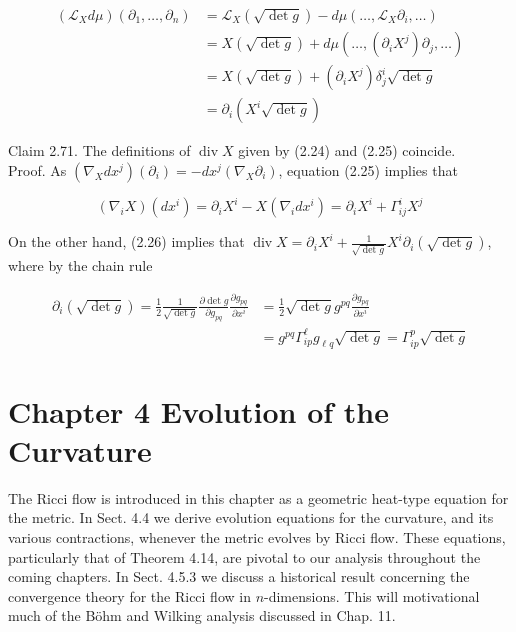 \documentclass[10pt, letterpaper]{article}
\begin{document}
$$
\begin{aligned}
\left(\mathcal{L}_{X} d \mu\right)\left(\partial_{1}, \ldots, \partial_{n}\right) & =\mathcal{L}_{X}(\sqrt{\operatorname{det} g})-d \mu\left(\ldots, \mathcal{L}_{X} \partial_{i}, \ldots\right) \\
& =X(\sqrt{\operatorname{det} g})+d \mu\left(\ldots,\left(\partial_{i} X^{j}\right) \partial_{j}, \ldots\right) \\
& =X(\sqrt{\operatorname{det} g})+\left(\partial_{i} X^{j}\right) \delta_{j}^{i} \sqrt{\operatorname{det} g} \\
& =\partial_{i}\left(X^{i} \sqrt{\operatorname{det} g}\right)
\end{aligned}
$$

Claim 2.71. The definitions of $\operatorname{div} X$ given by (2.24) and (2.25) coincide.\\
Proof. As $\left(\nabla_{X} d x^{j}\right)\left(\partial_{i}\right)=-d x^{j}\left(\nabla_{X} \partial_{i}\right)$, equation (2.25) implies that

$$
\left(\nabla_{i} X\right)\left(d x^{i}\right)=\partial_{i} X^{i}-X\left(\nabla_{i} d x^{i}\right)=\partial_{i} X^{i}+\Gamma_{i j}^{i} X^{j}
$$

On the other hand, (2.26) implies that $\operatorname{div} X=\partial_{i} X^{i}+\frac{1}{\sqrt{\operatorname{det} g}} X^{i} \partial_{i}(\sqrt{\operatorname{det} g})$, where by the chain rule

$$
\begin{aligned}
\partial_{i}(\sqrt{\operatorname{det} g})=\frac{1}{2} \frac{1}{\sqrt{\operatorname{det} g}} \frac{\partial \operatorname{det} g}{\partial g_{p q}} \frac{\partial g_{p q}}{\partial x^{i}} & =\frac{1}{2} \sqrt{\operatorname{det} g} g^{p q} \frac{\partial g_{p q}}{\partial x^{i}} \\
& =g^{p q} \Gamma_{i p}^{\ell} g_{\ell q} \sqrt{\operatorname{det} g}=\Gamma_{i p}^{p} \sqrt{\operatorname{det} g}
\end{aligned}
$$







\pagebreak



\section{Chapter 4 Evolution of the Curvature}

The Ricci flow is introduced in this chapter as a geometric heat-type equation for the metric. In Sect. 4.4 we derive evolution equations for the curvature, and its various contractions, whenever the metric evolves by Ricci flow. These equations, particularly that of Theorem 4.14, are pivotal to our analysis throughout the coming chapters. In Sect. 4.5.3 we discuss a historical result concerning the convergence theory for the Ricci flow in $n$-dimensions. This will motivational much of the Böhm and Wilking analysis discussed in Chap. 11.
\end{document}
